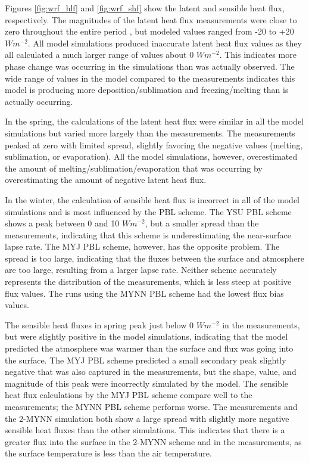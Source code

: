 Figures \ref{fig:wrf_hlf} and \ref{fig:wrf_shf} show the latent and sensible heat flux, respectively. The magnitudes of the latent heat flux measurements were close to zero throughout the entire period \cite{walden:2017}, but modeled values ranged from -20 to +20 $Wm^{-2}$. All model simulations produced inaccurate latent heat flux values as they all calculated a much larger range of values about 0 $Wm^{-2}$. This indicates more phase change was occurring in the simulations than was actually observed. The wide range of values in the model compared to the measurements indicates this model is producing more deposition/sublimation and freezing/melting than is actually occurring. 

In the spring, the calculations of the latent heat flux were similar in all the model simulations but varied more largely than the measurements. The measurements peaked at zero with limited spread, slightly favoring the negative values (melting, sublimation, or evaporation). All the model simulations, however, overestimated the amount of melting/sublimation/evaporation that was occurring by overestimating the amount of negative latent heat flux. 

In the winter, the calculation of sensible heat flux is incorrect in all of the model simulations and is most influenced by the PBL scheme. The YSU PBL scheme shows a peak between 0 and 10 $Wm^{-2}$, but a smaller spread than the measurements, indicating that this scheme is underestimating the near-surface lapse rate. The MYJ PBL scheme, however, has the opposite problem. The spread is too large, indicating that the fluxes between the surface and atmosphere are too large, resulting from a larger lapse rate. Neither scheme accurately represents the distribution of the measurements, which is less steep at positive flux values. The runs using the MYNN PBL scheme had the lowest flux bias values.

The sensible heat fluxes in spring peak just below 0 $Wm^{-2}$ in the measurements, but were slightly positive in the model simulations, indicating that the model predicted the atmosphere was warmer than the surface and flux was going into the surface. The MYJ PBL scheme predicted a small secondary peak slightly negative that was also captured in the measurements, but the shape, value, and magnitude of this peak were incorrectly simulated by the model. The sensible heat flux calculations by the MYJ PBL scheme compare well to the measurements; the MYNN PBL scheme performs worse. The measurements and the 2-MYNN simulation both show a large spread with slightly more negative sensible heat fluxes than the other simulations. This indicates that there is a greater flux into the surface in the 2-MYNN scheme and in the measurements, as the surface temperature is less than the air temperature.

